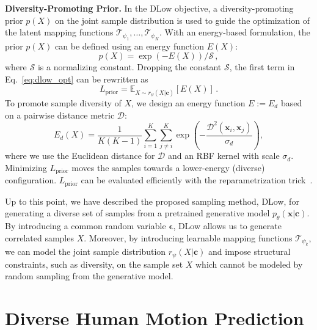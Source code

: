 \documentclass[runningheads]{llncs}
\begin{document}
	
	\vspace{2mm}
	\noindent\textbf{Diversity-Promoting Prior.} In the DLow objective, a diversity-promoting prior $p(X)$ on the joint sample distribution is used to guide the optimization of the latent mapping functions $\mathcal{T}_{\psi_1}, \ldots, \mathcal{T}_{\psi_K}$.  
	With an energy-based formulation, the prior $p(X)$ can be defined using an energy function $E(X)$:
	\begin{equation}
	\label{eq:dlow_energy}
	p(X) = \exp(-E(X)) / \mathcal{S}\,,
	\end{equation}
	where $\mathcal{S}$ is a normalizing constant.  Dropping the constant $\mathcal{S}$, the first term in Eq.~\eqref{eq:dlow_opt} can be rewritten as
	\begin{equation}
	\label{eq:dlow_diverse}
	L_{\text{prior}} = \mathbb{E}_{X \sim r_\psi(X|\mathbf{c})}[E(X)]\,.
	\end{equation}
	To promote sample diversity of $X$, we design an energy function $E := E_d$ based on a pairwise distance metric $\mathcal{D}$:
	\begin{equation}
	\label{eq:e_diverse}
	E_d(X) = \frac{1}{K(K-1)}\sum_{i=1}^K\sum_{j\neq i}^K \exp\left(-\frac{\mathcal{D}^2(\mathbf{x}_i, \mathbf{x}_j)} {\sigma_d}\right),
	\end{equation}
	where we use the Euclidean distance for $\mathcal{D}$ and an RBF kernel with scale $\sigma_d$. Minimizing $L_{\text{prior}}$ moves the samples towards a lower-energy (diverse) configuration.
	$L_{\text{prior}}$ can be evaluated efficiently with the reparametrization trick~\cite{kingma2013auto}.
	
	
	Up to this point, we have described the proposed sampling method, DLow, for generating a diverse set of samples from a pretrained generative model $p_\theta(\mathbf{x}|\mathbf{c})$. By introducing a common random variable $\boldsymbol{\epsilon}$, DLow allows us to generate correlated samples $X$. Moreover, by introducing learnable mapping functions $\mathcal{T}_{\psi_k}$, we can model the joint sample distribution $r_\psi(X|\mathbf{c})$ and impose structural constraints, such as diversity, on the sample set $X$ which cannot be modeled by random sampling from the generative model. 
	
	
	
	\section{Diverse Human Motion Prediction}
	\label{sec:motion_pred}
	
\end{document}
